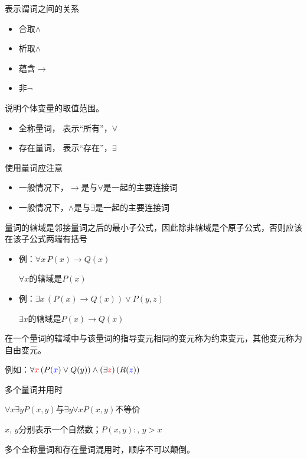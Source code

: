 \begin{definition}[联结词]
    表示谓词之间的关系
    \begin{itemize}
        \item 合取$\land$
        \item 析取$\land$
        \item 蕴含$\to$
        \item 非$\lnot$
    \end{itemize}
\end{definition}
\begin{definition}[量词]
    说明个体变量的取值范围。
    
    \begin{itemize}
        \item 全称量词，     
        表示“所有”，$\forall$
        \item 存在量词，        
        表示“存在”，$\exists$
    \end{itemize}
\end{definition}
\begin{note}
    使用量词应注意
    \begin{itemize}
        \item 一般情况下，$\to$是与$\forall$是一起的主要连接词
        \item 一般情况下，$\land$是与$\exists$是一起的主要连接词
    \end{itemize}
\end{note}
\begin{definition}[量词的辖域]
    \textcolor{main1}{量词的辖域}是邻接量词之后的最小子公式，\textcolor{main1}{因此除非辖域是个原子公式，否则应该在该子公式两端有括号}

    \begin{itemize}
        \item 例：$\forall x\, P(x)\to Q(x)$
        
        $\forall x$的辖域是$P(x)$
        \item 例：$\exists x\, (P(x)\to Q(x))\lor P(y,z)$
        
        $\exists x$的辖域是$P(x)\to Q(x)$
    \end{itemize}
\end{definition}
\begin{definition}[约束变元和自由变元]
    在一个量词的辖域中与该量词的\textcolor{main1}{指导变元}相同的变元称为\textcolor{main1}{约束变元}，其他变元称为自由变元。

    例如：$\forall \textcolor{red}{x}\left( P(\textcolor{blue}{x})\lor Q(y) \right)\land (\exists \textcolor{red}{z})\left( R(\textcolor{blue}{z}) \right)$
\end{definition}
\begin{note}
    多个量词并用时

    $\forall x\exists yP(x,y)$与$\exists y\forall xP(x,y)$不等价

    $x,\,y$分别表示一个自然数；$P(x,y):,\,y>x$

    多个全称量词和存在量词混用时，顺序不可以颠倒。
\end{note}
